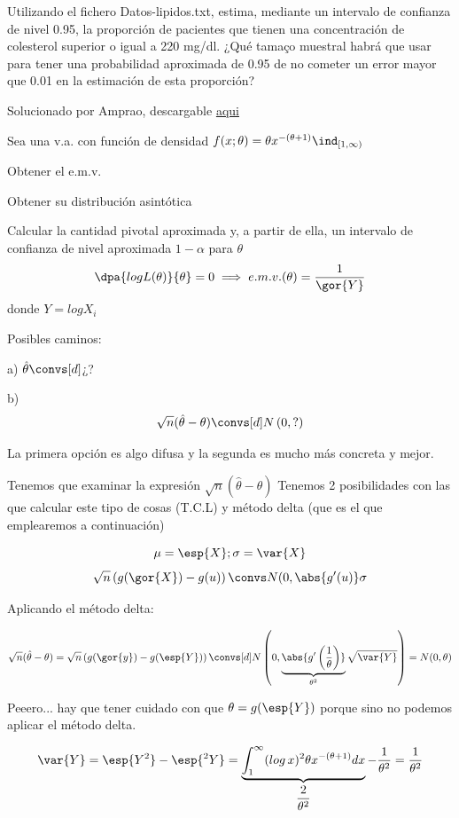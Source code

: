 \begin{problem}[4]
\ppart Utilizando el fichero Datos-lipidos.txt, estima, mediante un intervalo de confianza de nivel
0.95, la proporción de pacientes que tienen una concentración de colesterol superior o igual a
220 mg/dl. ¿Qué tamaço muestral habrá que usar para tener una probabilidad aproximada de 0.95 de no cometer un error mayor que 0.01 en la estimación de esta proporción?

\ppart
\solution
Solucionado por Amprao, descargable 
\href{http://www.uam.es/personal_pdi/ciencias/abaillo/MatEstI/T4DatosLipidos.pdf}{aqui}
\end{problem}
\begin{problem}[5] Sea una v.a. con función de densidad $f(x;\theta) = \theta x^{-(\theta + 1)}\ind_{[1,\infty)} $

\ppart Obtener el e.m.v.

\ppart Obtener su distribución asintótica

\ppart Calcular la cantidad pivotal aproximada y, a partir de ella, un intervalo de confianza de nivel aproximada $1-\alpha$ para $\theta$
\solution
\spart \[\dpa{logL(\theta)}{\theta} = 0 \implies e.m.v.(\theta) = \frac{1}{\gor{Y}}\]
donde $Y = log X_i$

\spart Posibles caminos:

a) $\hat{\theta} \convs[d] $¿?

b) \[\sqrt{n}(\hat{\theta} - \theta) \convs[d] N\left(0,?\right)\]

La primera opción es algo difusa y la segunda es mucho más concreta y mejor.

Tenemos que examinar la expresión $\sqrt{n}(\hat{\theta} - \theta)$
Tenemos 2 posibilidades con las que calcular este tipo de cosas (T.C.L) y método delta (que es el que emplearemos a continuación)

\[\mu = \esp{X}; \sigma = \var{X}\]
\[\sqrt{n}\left(g(\gor{X}) - g(u)\right) \convs N(0,\abs{g'(u)} \sigma\]

Aplicando el método delta:

\[
\sqrt{n}(\hat{\theta} - \theta) = \sqrt{ n}\left(g(\gor{y})-g(\esp{Y})\right)\convs[d] N\left(0,\underbrace{\abs{g'\left(\frac{1}{\theta}\right)}}_{\theta^2} \sqrt{\var{Y}}\right) = N(0,\theta)
\]

Peeero... hay que tener cuidado con que $\theta = g(\esp{Y})$ porque sino no podemos aplicar el método delta.

\[
\var{Y} = \esp{Y^2} - \esp{^2 Y} = \underbrace{\int_1^{\infty} (log\,x)^2 \theta x^{-(\theta + 1)}dx}_{\displaystyle\frac{2}{\theta^2}} - \frac{1}{\theta^2} = \frac{1}{\theta^2}
\]


\end{problem}
